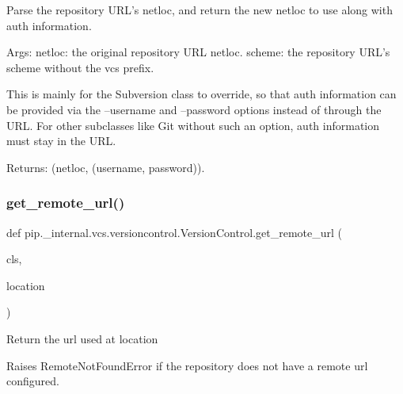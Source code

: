 \begin{DoxyVerb}Parse the repository URL's netloc, and return the new netloc to use
along with auth information.

Args:
  netloc: the original repository URL netloc.
  scheme: the repository URL's scheme without the vcs prefix.

This is mainly for the Subversion class to override, so that auth
information can be provided via the --username and --password options
instead of through the URL.  For other subclasses like Git without
such an option, auth information must stay in the URL.

Returns: (netloc, (username, password)).
\end{DoxyVerb}
 \mbox{\label{classpip_1_1__internal_1_1vcs_1_1versioncontrol_1_1VersionControl_a04eb4fa27542d4b4216df78db6fb539c}} 
\subsubsection{\texorpdfstring{get\+\_\+remote\+\_\+url()}{get\_remote\_url()}}
{\footnotesize\ttfamily def pip.\+\_\+internal.\+vcs.\+versioncontrol.\+Version\+Control.\+get\+\_\+remote\+\_\+url (\begin{DoxyParamCaption}\item[{}]{cls,  }\item[{}]{location }\end{DoxyParamCaption})}

\begin{DoxyVerb}Return the url used at location

Raises RemoteNotFoundError if the repository does not have a remote
url configured.
\end{DoxyVerb}
 \mbox{\label{classpip_1_1__internal_1_1vcs_1_1versioncontrol_1_1VersionControl_a1bbbb1f6cf52525423e888fdd9adbfb6}} 
